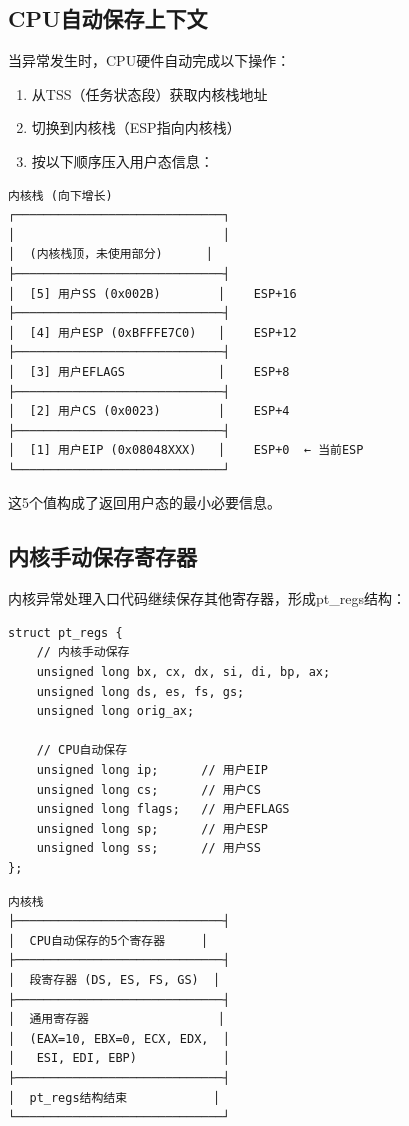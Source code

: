 \documentclass[UTF8,a4paper,12pt]{ctexart}
\begin{document}
\subsection{CPU自动保存上下文}

当异常发生时，CPU硬件自动完成以下操作：

\begin{enumerate}[leftmargin=2em]
    \item 从TSS（任务状态段）获取内核栈地址
    \item 切换到内核栈（ESP指向内核栈）
    \item 按以下顺序压入用户态信息：
\end{enumerate}

\begin{lstlisting}[style=cstyle,caption={内核栈布局（CPU自动保存）}]
内核栈 (向下增长)
┌─────────────────────────────┐
│                             │
│  (内核栈顶，未使用部分)      │
├─────────────────────────────┤
│  [5] 用户SS (0x002B)        │    ESP+16
├─────────────────────────────┤
│  [4] 用户ESP (0xBFFFE7C0)   │    ESP+12
├─────────────────────────────┤
│  [3] 用户EFLAGS             │    ESP+8
├─────────────────────────────┤
│  [2] 用户CS (0x0023)        │    ESP+4
├─────────────────────────────┤
│  [1] 用户EIP (0x08048XXX)   │    ESP+0  ← 当前ESP
└─────────────────────────────┘
\end{lstlisting}

这5个值构成了返回用户态的最小必要信息。

\subsection{内核手动保存寄存器}

内核异常处理入口代码继续保存其他寄存器，形成pt\_regs结构：

\begin{lstlisting}[style=cstyle,caption={pt\_regs结构定义}]
struct pt_regs {
    // 内核手动保存
    unsigned long bx, cx, dx, si, di, bp, ax;
    unsigned long ds, es, fs, gs;
    unsigned long orig_ax;

    // CPU自动保存
    unsigned long ip;      // 用户EIP
    unsigned long cs;      // 用户CS
    unsigned long flags;   // 用户EFLAGS
    unsigned long sp;      // 用户ESP
    unsigned long ss;      // 用户SS
};
\end{lstlisting}

\begin{lstlisting}[style=cstyle,caption={完整的内核栈布局}]
内核栈
├─────────────────────────────┤
│  CPU自动保存的5个寄存器     │
├─────────────────────────────┤
│  段寄存器 (DS, ES, FS, GS)  │
├─────────────────────────────┤
│  通用寄存器                  │
│  (EAX=10, EBX=0, ECX, EDX,  │
│   ESI, EDI, EBP)            │
├─────────────────────────────┤
│  pt_regs结构结束            │
└─────────────────────────────┘
\end{lstlisting}
\end{document}
